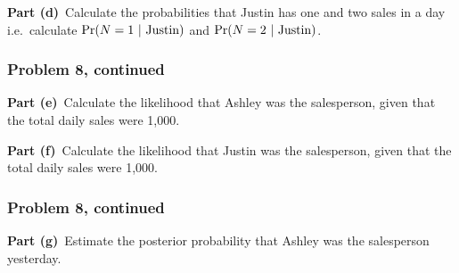 \documentclass[12pt]{article}
\theoremstyle{definition}
\begin{document}
\vspace{3in}
\noindent
{\bf Part (d)}\ Calculate the probabilities that Justin has one and two sales in a day i.e.\ calculate $\Pr(N = 1\ |\ \hbox{Justin})$ and $\Pr(N = 2\ |\ \hbox{Justin})$.




\newpage
\subsubsection*{Problem 8, continued}
\noindent
{\bf Part (e)}\ Calculate the likelihood that Ashley was the salesperson, given that the total daily sales were 1,000.




\vspace{3in}
\noindent
{\bf Part (f)}\ Calculate the likelihood that Justin was the salesperson, given that the total daily sales were 1,000.



\newpage
\subsubsection*{Problem 8, continued}
\noindent
{\bf Part (g)}\ Estimate the posterior probability that Ashley was the salesperson yesterday.
\end{document}
